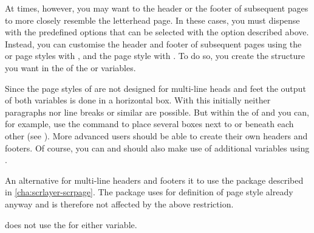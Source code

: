 \begin{Declaration}
\end{Declaration}
At times, however, you may want to the header or the footer of subsequent
pages to more closely resemble the letterhead page. In these cases, you must
dispense with the predefined options that can be selected with the
 option
described above.  Instead, you can customise the header and footer of
subsequent pages using the
%
 or
 page
styles with , and the
%
 page
style with .  To do so, you
create the structure you want in the  of
the  or
 variables.

Since the page styles of  are not
designed for multi-line heads and feet the output of both variables is done in
a horizontal box. With this initially neither paragraphs nor line breaks or
similar are possible. But within the  of 
and  you can, for example, use the  command
to place several boxes next to or beneath each other (see
\cite{latex:usrguide}). More advanced users should be able to create their own
headers and footers. Of course, you can and should also make use of additional
variables using .

An alternative for multi-line headers and footers it to use the
%
 package described in
\autoref{cha:scrlayer-scrpage}. The
 package uses for definition
of page style %
already  anyway and is therefore not affected by the
above restriction.

\KOMAScript{} does not use the  for either variable.%
%
%
\EndIndexGroup%
\EndIndexGroup%
\EndIndexGroup


